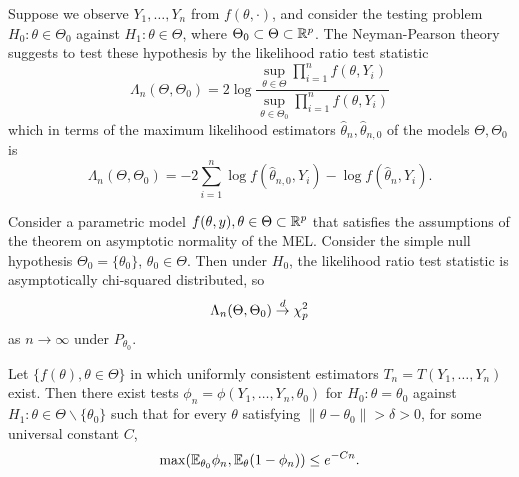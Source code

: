 \begin{defn}
  \label{sec:param-test-theory-1}
  Suppose we observe $Y_{1}, \dots, Y_{n}$ from $f(\theta, \cdot)$,
  and consider the testing problem $H_{0}: \theta \in \Theta_{0}$
  against $H_{1}: \theta \in \Theta$, where $\Theta_{0} \subset \Theta
  \subset \mathbb{R}^{p}$. The Neyman-Pearson theory suggests to test these
  hypothesis by the likelihood ratio test statistic
  \begin{equation}
    \label{eq:22}
    \Lambda_{n}(\Theta, \Theta_{0}) = 2 \log \frac{\sup_{\theta \in
        \Theta} \prod_{i=1}^{n} f(\theta, Y_{i})}{\sup_{\theta \in
        \Theta_{0}} \prod_{i=1}^{n} f(\theta, Y_{i})}
  \end{equation} which in terms of the maximum likelihood estimators
  $\hat \theta_{n}, \hat \theta_{n, 0}$ of the models $\Theta,
  \Theta_{0}$ is
  \begin{equation}
    \label{eq:23}
    \Lambda_{n}(\Theta, \Theta_{0}) = -2 \sum_{i=1}^{n} \log f(\hat
    \theta_{n, 0}, Y_{i}) - \log f(\hat \theta_{n}, Y_{i}).
  \end{equation}
\end{defn}

\begin{thm}
  Consider a parametric model $f(\theta, y), \theta \in \Theta \subset
  \mathbb{R}^{p}$ that satisfies the assumptions of the theorem on asymptotic
  normality of the MEL.  Consider the simple null hypothesis
  $\Theta_{0} = \{ \theta_{0} \} $, $\theta_{0} \in \Theta$.  Then
  under $H_{0}$, the likelihood ratio test statistic is asymptotically
  chi-squared distributed, so
  \begin{equation}
    \label{eq:24}
    \Lambda_{n}(\Theta, \Theta_{0}) \overset{d}{\rightarrow} \chi_{p}^{2}
  \end{equation} as $n \rightarrow \infty$ under $P_{\theta_{0}}$.
\end{thm}

\begin{thm}
  Let $\{ f(\theta), \theta \in \Theta \} $ in which uniformly
  consistent estimators $T_{n} = T(Y_{1}, \dots, Y_{n})$ exist.  Then
  there exist tests $\phi_{n} = \phi(Y_{1}, \dots, Y_{n}, \theta_{0})$
  for $H_{0}: \theta = \theta_{0}$ against $H_{1}: \theta \in \Theta
  \backslash \{ \theta_{0} \} $ such that for every $\theta$
  satisfying $\| \theta - \theta_{0} \| > \delta > 0$, for some
  universal constant $C$,
  \begin{equation}
    \label{eq:26}
    \max(\E_{\theta_{0}} \phi_{n}, \E_{\theta}(1 - \phi_{n})) \leq e^{-Cn}.
  \end{equation}
\end{thm}

